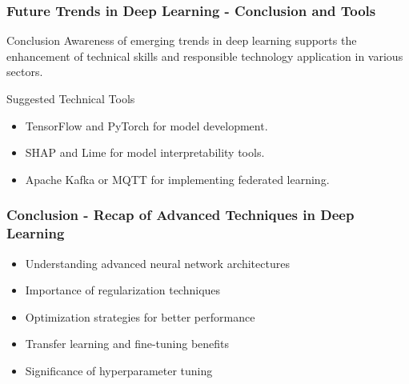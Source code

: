 \documentclass[aspectratio=169]{beamer}
\begin{document}
\begin{frame}[fragile]
    \frametitle{Future Trends in Deep Learning - Conclusion and Tools}
    \begin{block}{Conclusion}
        Awareness of emerging trends in deep learning supports the enhancement of technical skills and responsible technology application in various sectors.
    \end{block}

    \begin{block}{Suggested Technical Tools}
        \begin{itemize}
            \item TensorFlow and PyTorch for model development.
            \item SHAP and Lime for model interpretability tools.
            \item Apache Kafka or MQTT for implementing federated learning.
        \end{itemize}
    \end{block}
\end{frame}

\begin{frame}[fragile]
    \frametitle{Conclusion - Recap of Advanced Techniques in Deep Learning}
    
    \begin{itemize}
        \item Understanding advanced neural network architectures
        \item Importance of regularization techniques
        \item Optimization strategies for better performance
        \item Transfer learning and fine-tuning benefits
        \item Significance of hyperparameter tuning
    \end{itemize}
\end{frame}
\end{document}
